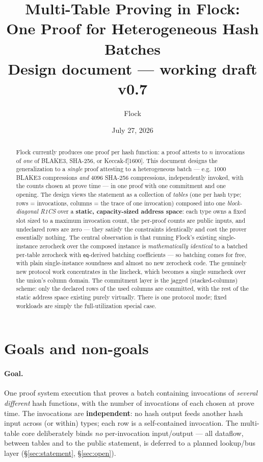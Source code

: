 \documentclass[11pt]{article}
\title{Multi-Table Proving in Flock:\\ One Proof for Heterogeneous Hash Batches\\[0.6ex]
\large Design document --- working draft v0.7}
\author{Flock}
\date{July 27, 2026}
\newcommand{\eq}{\mathsf{eq}}
\theoremstyle{definition}
\begin{document}
\maketitle

\begin{abstract}
Flock currently produces one proof per hash function: a proof attests to $n$
invocations of \emph{one} of BLAKE3, SHA-256, or Keccak-f[1600]. This document
designs the generalization to a \emph{single} proof attesting to a
heterogeneous batch --- e.g.\ $1000$ BLAKE3 compressions \emph{and} $4096$
SHA-256 compressions, independently invoked, with the counts chosen at prove
time --- in one proof with one commitment and one opening. The design views
the statement as a collection of \emph{tables} (one per hash type; rows =
invocations, columns = the trace of one invocation) composed into one
\emph{block-diagonal R1CS} over a \textbf{static, capacity-sized address
space}: each type owns a fixed slot sized to a maximum invocation count, the
per-proof counts are public inputs, and undeclared rows are zero --- they
satisfy the constraints identically and cost the prover essentially nothing.
The central observation is that running Flock's existing single-instance
zerocheck over the composed instance is \emph{mathematically identical} to a
batched per-table zerocheck with $\eq$-derived batching coefficients --- so
batching comes for free, with plain single-instance soundness and almost no
new zerocheck code. The genuinely new protocol work concentrates in the
lincheck, which becomes a single sumcheck over the union's column domain. The commitment layer is the jagged (stacked-columns) scheme:
only the declared rows of the used columns are committed, with the rest of
the static address space existing purely virtually. There is one protocol mode; fixed
workloads are simply the full-utilization special case.
\end{abstract}

\tableofcontents

\section{Goals and non-goals}\label{sec:goals}

\paragraph{Goal.} One proof system execution that proves a batch containing
invocations of \emph{several different} hash functions, with the number of
invocations of each chosen at prove time. The invocations are
\textbf{independent}: no hash output feeds another hash input across (or
within) types; each row is a self-contained invocation. The multi-table
core deliberately binds \emph{no} per-invocation input/output --- all
dataflow, between tables and to the public statement, is deferred to a
planned lookup/bus layer (\S\ref{sec:statement}, \S\ref{sec:open}).
\end{document}
